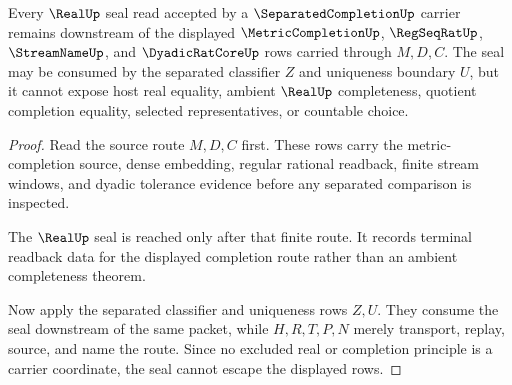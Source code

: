 \begin{theorem}
\label{thm:separatedcompletion-real-seal-nonescape}
Every $\RealUp$ seal read accepted by a $\SeparatedCompletionUp$ carrier remains downstream of the displayed $\MetricCompletionUp$, $\RegSeqRatUp$, $\StreamNameUp$, and $\DyadicRatCoreUp$ rows carried through $M,D,C$. The seal may be consumed by the separated classifier $Z$ and uniqueness boundary $U$, but it cannot expose host real equality, ambient $\RealUp$ completeness, quotient completion equality, selected representatives, or countable choice.
\end{theorem}
\begin{proof}
Read the source route $M,D,C$ first. These rows carry the metric-completion source, dense embedding, regular rational readback, finite stream windows, and dyadic tolerance evidence before any separated comparison is inspected.

The $\RealUp$ seal is reached only after that finite route. It records terminal readback data for the displayed completion route rather than an ambient completeness theorem.

Now apply the separated classifier and uniqueness rows $Z,U$. They consume the seal downstream of the same packet, while $H,R,T,P,N$ merely transport, replay, source, and name the route. Since no excluded real or completion principle is a carrier coordinate, the seal cannot escape the displayed rows.
\end{proof}

